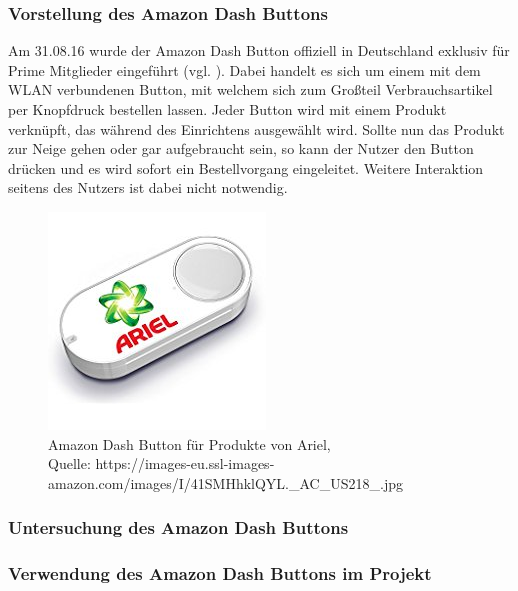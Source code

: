 \subsubsection{Vorstellung des Amazon Dash Buttons}        
\label{sec:Vorstellung des Amazon Dash Buttons} 
Am 31.08.16 wurde der Amazon Dash Button offiziell in Deutschland exklusiv für Prime Mitglieder eingeführt (vgl. \cite{ONLINE.31.08.2016}).
Dabei handelt es sich um einem mit dem WLAN verbundenen Button, mit welchem sich zum Großteil Verbrauchsartikel per Knopfdruck bestellen lassen. Jeder Button wird mit einem Produkt verknüpft, das während des Einrichtens ausgewählt wird. Sollte nun das Produkt zur Neige gehen oder gar aufgebraucht sein, so kann der Nutzer den Button drücken und es wird sofort ein Bestellvorgang eingeleitet. Weitere Interaktion seitens des Nutzers ist dabei nicht notwendig.

\begin{figure}[!htb]
	\centering
	\includegraphics[scale=0.5]{Dash.jpg}
	\caption[Amazon Dash Button für Produkte von Ariel]{Amazon Dash Button für Produkte von Ariel,\\ Quelle: https://images-eu.ssl-images-amazon.com/images/I/41SMHhklQYL.\_AC\_US218\_.jpg}
\end{figure}

\subsubsection{Untersuchung des Amazon Dash Buttons}
\label{sec:Untersuchung des Amazon Dash Buttons}

\subsubsection{Verwendung des Amazon Dash Buttons im Projekt}
\label{sec:Verwendung des Amazon Dash Buttons im Projekt}
